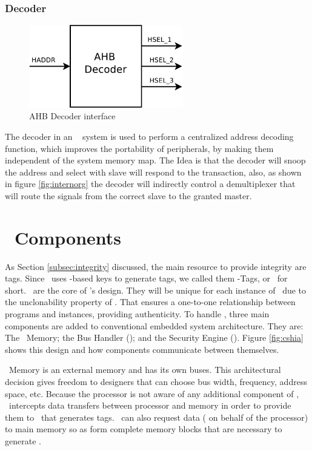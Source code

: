 \subsubsection{Decoder}

\begin{figure}[ht]
    \centering
    \includegraphics[width=0.6\textwidth]{figures/pdf/ahb_decoder_new.pdf}
    \caption{AHB Decoder interface}
    \label{fig:decoder int}
\end{figure}
 The decoder in an \amba~ system is used to perform a centralized address decoding function, which improves the portability of peripherals, by making them independent of the system memory map. The Idea is that the decoder will snoop the address and select with slave will respond to the transaction, also, as shown in figure \ref{fig:internorg} the decoder will indirectly control a demultiplexer that will route the signals from the correct slave to the granted master.

 

\section{\cshia~Components}
\label{sec:Components-of-the-Architecture}
As Section \ref{subsec:integrity} discussed, the main resource to provide integrity are tags. Since \cshia~uses \puf-based keys to generate tags, we called them \puf-Tags, or \ptags~for short. \ptags~are the core of \cshia's design. They will be unique for each instance of \cshia~due to the unclonability property of \pufs. That ensures a one-to-one relationship between programs and instances, providing authenticity. To handle \ptags, three main components are added to conventional embedded system architecture. They are: The \ptag~Memory; the Bus Handler (\handler); and the Security Engine (\seceng). Figure \ref{fig:cshia} shows this design and how components communicate between themselves. 

\ptag~Memory is an external memory and has its own buses. This architectural decision gives freedom to designers that can choose bus width, frequency, address space, etc. Because the processor is not aware of any additional component of \cshia, \handler~intercepts data transfers between processor and memory in order to provide them to \seceng~that generates tags. \handler~can also request data ( on behalf of the processor) to main memory so as form complete memory blocks that are necessary to generate \ptags.

